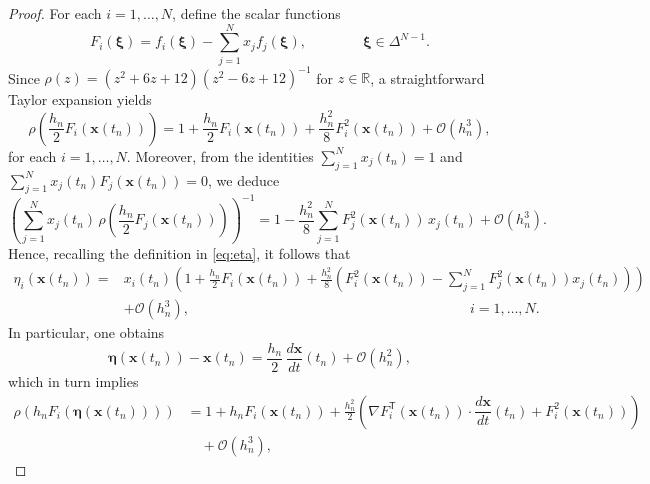 \documentclass[10pt,a4paper]{amsart}
\begin{document}
\begin{proof}
    For each \( i = 1, \dots, N \), define the scalar functions
    \begin{equation}\label{eq:F_defn}
        F_i(\bm{\xi}) = f_i(\bm{\xi}) - \textstyle\sum_{j=1}^N x_j f_j(\bm{\xi}), \qquad \qquad \bm{\xi}\in\Delta^{N-1}.
    \end{equation}
    Since $\rho(z) = (z^2 + 6z + 12)(z^2 - 6z + 12)^{-1}$ for $z \in \mathbb{R}$, a straightforward Taylor expansion yields
    \begin{equation*}
        \rho\left( \frac{h_n}{2} F_i(\bm{x}(t_n)) \right) = 1 + \frac{h_n}{2} F_i(\bm{x}(t_n)) + \frac{h_n^2}{8} F_i^2(\bm{x}(t_n)) + \mathcal{O}(h_n^3),
    \end{equation*}
    for each $i=1,\dots,N.$ Moreover, from the identities \( \sum_{j=1}^N x_j(t_n) = 1 \) and \( \sum_{j=1}^N x_j(t_n) F_j(\bm{x}(t_n)) = 0 \), we deduce
        \begin{equation*}
        \left( \sum_{j=1}^N x_j(t_n) \, \rho\left( \frac{h_n}{2} F_j(\bm{x}(t_n)) \right) \right)^{-1} = 1 - \frac{h_n^2}{8} \sum_{j=1}^N F_j^2(\bm{x}(t_n)) \, x_j(t_n) + \mathcal{O}(h_n^3).
        \end{equation*}
    Hence, recalling the definition in \eqref{eq:eta}, it follows that
    \begin{equation}\label{eq:temp_1}
        \begin{split}
            \eta_i(\bm{x}(t_n))=&x_i(t_{n}) \left(1+\frac{h_n}{2}F_i(\bm{x}(t_n))+\frac{h_n^2}{8}\left(F_i^2(\bm{x}(t_{n}))-\sum_{j=1}^NF_j^2(\bm{x}(t_{n}))x_j(t_n) \right)\right)\\
            &+\mathcal{O}(h_n^3), \qquad \qquad \qquad \qquad \qquad \qquad\qquad \qquad \qquad \qquad i=1,\dots,N.
        \end{split}
    \end{equation}
    In particular, one obtains
        \begin{equation*}
        \bm{\eta}(\bm{x}(t_n))-\bm{x}(t_n) = \frac{h_n}{2} \, \dfrac{d \bm{x}}{d t}(t_n) + \mathcal{O}(h_n^2),
        \end{equation*}
    which in turn implies
    \begin{equation*}
        \begin{split}
            \rho \left( h_n F_i(\bm{\eta}(\bm{x}(t_n))) \right) &= 1 + h_n F_i(\bm{x}(t_n)) + \frac{h_n^2}{2} \left( \nabla F_i^\mathsf{T}(\bm{x}(t_n)) \cdot \dfrac{d \bm{x}}{d t}(t_n) + F_i^2(\bm{x}(t_n)) \right) \\
            & \quad + \mathcal{O}(h_n^3),

\end{split}
\end{equation*}
\end{proof}
\end{document}
